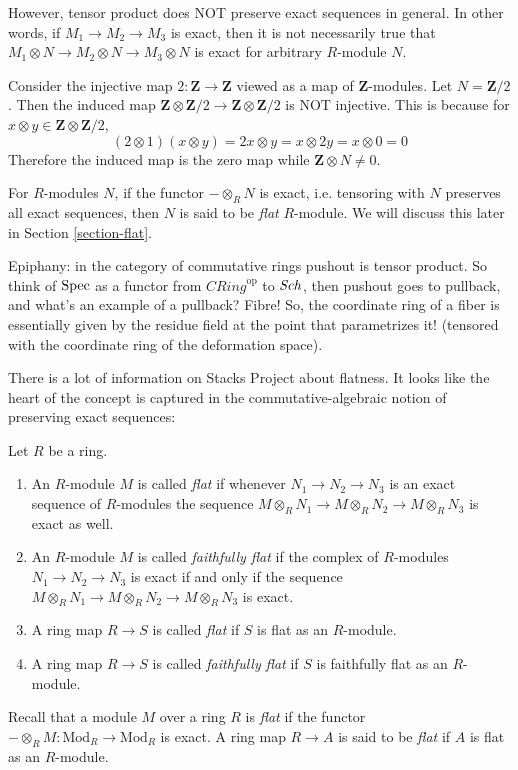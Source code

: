 \begin{remark}
\label{remark-tensor-product-not-exact}
However, tensor product does NOT preserve
exact sequences in general.
In other words, if $M_1 \to M_2 \to M_3$ is
exact, then it is not necessarily true that
$M_1 \otimes N \to M_2 \otimes N \to M_3
\otimes N$
is exact for arbitrary $R$-module $N$.
\end{remark}

\begin{example}
\label{example-tensor-product-not-exact}
Consider the injective map $2 : \mathbf{Z}\to
\mathbf{Z}$
viewed as a map of $\mathbf{Z}$-modules.
Let $N = \mathbf{Z}/2$. Then the induced map
$\mathbf{Z} \otimes \mathbf{Z}/2 \to
\mathbf{Z} \otimes \mathbf{Z}/2$
is NOT injective. This is because for
$x \otimes y\in \mathbf{Z} \otimes
\mathbf{Z}/2$,
$$
(2 \otimes 1)(x \otimes y) = 2x \otimes y = x
\otimes 2y = x \otimes 0 = 0
$$
Therefore the induced map is the zero map
while $\mathbf{Z} \otimes N\neq 0$.
\end{example}

\begin{definition}
\label{definition-flat-module}
For $R$-modules $N$, if the
functor $-\otimes_R N$ is exact, i.e.
tensoring
with $N$ preserves all exact
sequences, then $N$ is said to be {\it flat}
$R$-module.
We will discuss this later in Section
\ref{section-flat}.
\end{definition}

\medskip\noindent
Epiphany:
in the category of commutative rings
pushout is tensor product.
So think of $\mathop{\mathrm{Spec}} $ as a functor
from $\mathit{CRing}^{\text{op}}$ to $\mathit{Sch}$,
then pushout goes to pullback,
and what's an example of a pullback?
Fibre!
So, the coordinate ring of a fiber
is essentially given by the residue field
at the point that parametrizes it!
(tensored with the coordinate ring
of the deformation space).

There is a lot of information on Stacks
Project about flatness.
It looks like the heart of the concept is
captured in the commutative-algebraic notion
of preserving
exact sequences:

\begin{definition}
\label{definition-flat}
Let $R$ be a ring.
\begin{enumerate}
\item An $R$-module $M$ is called {\it flat}
if whenever
$N_1 \to N_2 \to N_3$ is an exact sequence of
$R$-modules
the sequence $M \otimes_R N_1 \to M \otimes_R
N_2 \to M \otimes_R N_3$
is exact as well.
\item An $R$-module $M$ is called {\it
faithfully flat} if the
complex of $R$-modules
$N_1 \to N_2 \to N_3$ is exact if and only if
the sequence $M \otimes_R N_1 \to M \otimes_R
N_2 \to M \otimes_R N_3$
is exact.
\item A ring map $R \to S$ is called {\it
flat} if
$S$ is flat as an $R$-module.
\item A ring map $R \to S$ is called {\it
faithfully flat} if
$S$ is faithfully flat as an $R$-module.
\end{enumerate}
\end{definition}

\medskip\noindent
Recall that a module $M$ over a ring $R$ is
{\it flat} if the functor
$-\otimes_R M : \text{Mod}_R \to
\text{Mod}_R$ is exact. A ring map
$R \to A$ is said to be {\it flat} if $A$ is
flat as an $R$-module.






